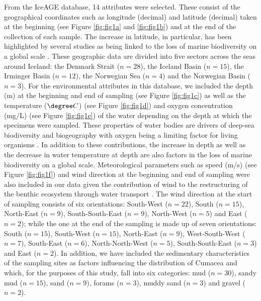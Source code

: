 From the IceAGE database, 14 attributes were selected. These consist of the geographical coordinates such as longitude (decimal) and latitude (decimal) taken at the beginning (see Figure \ref{fig:fig1a} and \ref{fig:fig1b}) and at the end of the collection of each sample. The increase in latitude, in particular, has been highlighted by several studies as being linked to the loss of marine biodiversity on a global scale \citep{rex1993global, lambshead2000latitudinal, gage2004diversity}. These geographic data are divided into five sectors across the seas around Iceland: the Denmark Strait (\( n=28 \)), the Iceland Basin (\( n=15 \)), the Irminger Basin (\( n=12 \)), the Norwegian Sea (\( n=4 \)) and the Norwegian Basin (\( n=3 \)). For the environmental attributes in this database, we included the depth (m) at the beginning and end of sampling (see Figure \ref{fig:fig1c}) as well as the temperature (\( \degree C \)) (see Figure \ref{fig:fig1d}) and oxygen concentration (mg/L) (see Figure \ref{fig:fig1e}) of the water depending on the depth at which the specimens were sampled. These properties of water bodies are drivers of deep-sea biodiversity and biogeography with oxygen being a limiting factor for living organisms \citep{keeling2010ocean}. In addition to these contributions, the increase in depth \citep{rex2006global, roberts2009cold, costello2017marine} as well as the decrease in water temperature at depth \citep{lambshead2000latitudinal} are also factors in the loss of marine biodiversity on a global scale. Meteorological parameters such as speed (m/s) (see Figure \ref{fig:fig1f}) and wind direction at the beginning and end of sampling were also included in our data given the contribution of wind to the restructuring of the benthic ecosystem through water transport \citep{saeedi2022environmental, waga2020recent}. The wind direction at the start of sampling consists of six orientations: South-West (\( n=22 \)), South (\( n=15 \)), North-East (\( n=9 \)), South-South-East (\( n=9 \)), North-West (\( n=5 \)) and East (\( n=2 \)); while the one at the end of the sampling is made up of seven orientations: South (\( n=15 \)), South-West (\( n=15 \)), North-East (\( n=9 \)), West-South-West (\( n=7 \)), South-East (\( n=6 \)), North-North-West (\( n=5 \)), South-South-East (\( n=3 \)) and East (\( n=2 \)). In addition, we have included the sedimentary characteristics of the sampling sites as factors influencing the distribution of Cumacea \citep{uhlir2021adding} and which, for the purposes of this study, fall into six categories: mud (\( n=30 \)), sandy mud (\( n=15 \)), sand (\( n=9 \)), forams (\( n=3 \)), muddy sand (\( n=3 \)) and gravel (\( n=2 \)).

